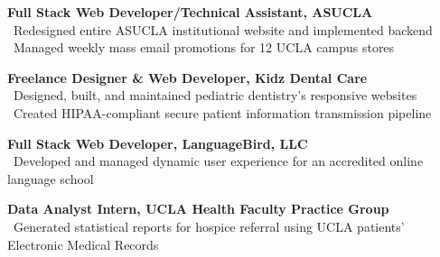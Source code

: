 \pubspace

\textbf{Full Stack Web Developer/Technical Assistant, ASUCLA}\\
\textendash\ Redesigned entire ASUCLA institutional website and implemented backend\\
\textendash\ Managed weekly mass email promotions for 12 UCLA campus stores

\pubspace

\textbf{Freelance Designer \& Web Developer, Kidz Dental Care}\\
\textendash\ Designed, built, and maintained pediatric dentistry's responsive websites\\
\textendash\ Created HIPAA-compliant secure patient information transmission pipeline

\pubspace

\textbf{Full Stack Web Developer, LanguageBird\textsuperscript{\textregistered}, LLC}\\
\textendash\ Developed and managed dynamic user experience for an accredited online language school

\pubspace



\textbf{Data Analyst Intern, UCLA Health Faculty Practice Group}\\
\textendash\ Generated statistical reports for hospice referral using UCLA patients' Electronic Medical Records